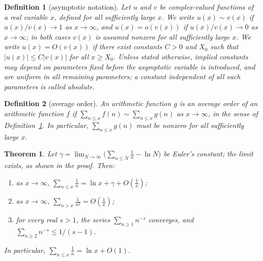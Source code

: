 \documentclass[11pt]{article}
\theoremstyle{ntstyle}
\newtheorem{theorem}{Theorem}[subsection]
\newtheorem{definition}{Definition}[subsection]
\begin{document}
\begin{definition}[asymptotic notation]\label{def:5.7.1} Let $u$ and $v$ be complex-valued functions of a real variable $x$, defined for all sufficiently large $x$.
	We write $u(x)\sim v(x)$ if $u(x)/v(x)\to1$ as $x\to\infty$, and
	$u(x)=o(v(x))$ if $u(x)/v(x)\to0$ as $x\to\infty$; in both cases $v(x)$ is
	assumed nonzero for all sufficiently large $x$. We write $u(x)=O(v(x))$ if there exist constants
	$C>0$ and $X_0$ such that $|u(x)|\le C|v(x)|$ for all $x\ge X_0$.
	Unless stated otherwise, implied constants may depend on parameters fixed
	before the asymptotic variable is introduced, and are uniform in all
	remaining parameters; a constant independent of all such parameters is
	called absolute.
\end{definition}
\begin{definition}[average order]\label{def:5.7.2} An arithmetic
	function $g$ is an average order of an arithmetic function $f$ if
	$\sum_{n\le x}f(n)\sim\sum_{n\le x}g(n)$ as $x\to\infty$, in the sense of Definition~\ref{def:5.7.1}.
	In particular, $\sum_{n\le x}g(n)$ must be nonzero for all sufficiently large $x$.
\end{definition}
\begin{theorem}\label{thm:5.7.1} Let $\gamma=\lim_{N\to\infty}\bigl(\sum_{n\le N}\frac1n-\ln N\bigr)$ be Euler's constant; the limit exists, as shown in the proof. Then:
	\begin{enumerate}[label={\alph*)}]
		\item as $x\to\infty$, $\displaystyle \sum_{n\le x}\frac{1}{n}=\ln x+\gamma+O\!\left(\frac{1}{x}\right)$;
		\item as $x\to\infty$, $\displaystyle \sum_{n>x}\frac{1}{n^{2}}=O\!\left(\frac{1}{x}\right)$;
		\item for every real $s>1$, the series $\sum_{n\ge1}n^{-s}$ converges, and $\sum_{n\ge2}n^{-s}\le1/(s-1)$.
	\end{enumerate}
	In particular, $\sum_{n\le x}\tfrac{1}{n}=\ln x+O(1)$.
\end{theorem}
\end{document}

